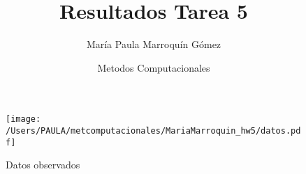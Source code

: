\documentclass[11pt,a4paper]{article}
\author{María Paula Marroquín Gómez}
\title{Resultados Tarea 5}
\date{Metodos Computacionales}
\begin{document}
\maketitle

\begin{figure}[H]
\centering
	\texttt{[image: /Users/PAULA/metcomputacionales/MariaMarroquin\_hw5/datos.pdf]}
	\caption{Datos observados}
\end{figure}
\end{document}
